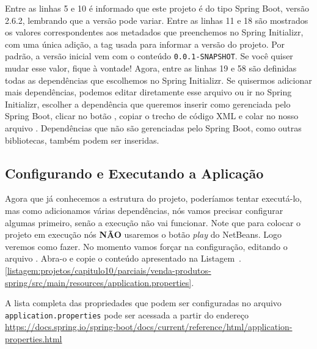 Entre as linhas 5 e 10 é informado que este projeto é do tipo Spring Boot, versão 2.6.2, lembrando que a versão pode variar. Entre as linhas 11 e 18 são mostrados os valores correspondentes aos metadados que preenchemos no Spring Initializr, com uma única adição, a tag  usada para informar a versão do projeto. Por padrão, a versão inicial vem com o conteúdo \texttt{0.0.1-SNAPSHOT}. Se você quiser mudar esse valor, fique à vontade! Agora, entre as linhas 19 e 58 são definidas todas as dependências que escolhemos no Spring Initializr. Se quisermos adicionar mais dependências, podemos editar diretamente esse arquivo ou ir no Spring Initializr, escolher a dependência que queremos inserir como gerenciada pelo Spring Boot, clicar no botão , copiar o trecho de código XML e colar no nosso arquivo . Dependências que não são gerenciadas pelo Spring Boot, como outras bibliotecas, também podem ser inseridas.


\subsection{Configurando e Executando a Aplicação}

Agora que já conhecemos a estrutura do projeto, poderíamos tentar executá-lo, mas como adicionamos várias dependências, nós vamos precisar configurar algumas primeiro, senão a execução não vai funcionar. Note que para colocar o projeto em execução nós \textbf{NÃO} usaremos o botão \textit{play} do NetBeans. Logo veremos como fazer. No momento vamos forçar na configuração, editando o arquivo . Abra-o e copie o conteúdo apresentado na Listagem~\thechapter.\ref{listagem:projetos/capitulo10/parciais/venda-produtos-spring/src/main/resources/application.properties}.


\begin{saibaMais}
    A lista completa das propriedades que podem ser configuradas no arquivo \texttt{application.properties} pode ser acessada a partir do endereço  \url{https://docs.spring.io/spring-boot/docs/current/reference/html/application-properties.html}
\end{saibaMais}


